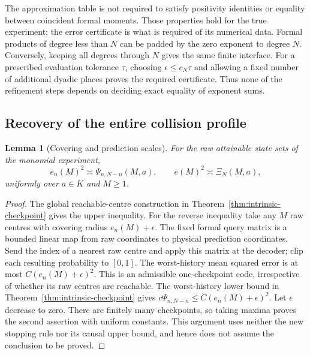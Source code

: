 \documentclass[11pt]{amsart}
\newtheorem{lemma}[theorem]{Lemma}
\theoremstyle{definition}\newtheorem{definition}[theorem]{Definition}
\theoremstyle{remark}\newtheorem{remark}[theorem]{Remark}
\begin{document}
The approximation table is not required to satisfy positivity identities
or equality between coincident formal moments. Those properties hold for
the true experiment; the error certificate is what is required of its
numerical data. Formal products of degree less than $N$ can be padded
by the zero exponent to degree $N$. Conversely, keeping all degrees
through $N$ gives the same finite interface. For a prescribed evaluation
tolerance $\tau$, choosing $\epsilon\le c_N\tau$ and allowing a fixed
number of additional dyadic places proves the required certificate.
Thus none of the refinement steps depends on deciding exact equality
of exponent sums.

\subsection{Recovery of the entire collision profile}
\begin{lemma}[Covering and prediction scales]\label{lem:cover-profile}
For the raw attainable state sets of the monomial experiment,
\begin{equation}\label{eq:cover-profile}
 e_n(M)^2\asymp\Psi_{n,N-n}(M,a),\qquad
 e(M)^2\asymp\Xi_N(M,a),
\end{equation}
uniformly over $a\in K$ and $M\ge1$.
\end{lemma}
\begin{proof}
The global reachable-centre construction in
Theorem~\ref{thm:intrinsic-checkpoint} gives the upper inequality.
For the reverse inequality take any $M$ raw centres with covering radius
$e_n(M)+\epsilon$. The fixed formal query matrix is a bounded linear
map from raw coordinates to physical prediction coordinates. Send the
index of a nearest raw centre and apply this matrix at the decoder;
clip each resulting probability to $[0,1]$. The worst-history mean
squared error is at most $C(e_n(M)+\epsilon)^2$. This is an admissible
one-checkpoint code, irrespective of whether its raw centres are
reachable. The worst-history lower bound in
Theorem~\ref{thm:intrinsic-checkpoint} gives
$c\Psi_{n,N-n}\le C(e_n(M)+\epsilon)^2$.
Let $\epsilon$ decrease to zero. There are finitely many checkpoints,
so taking maxima proves the second assertion with uniform constants.
This argument uses neither the new stopping rule nor its causal upper
bound, and hence does not assume the conclusion to be proved.
\end{proof}
\end{document}
